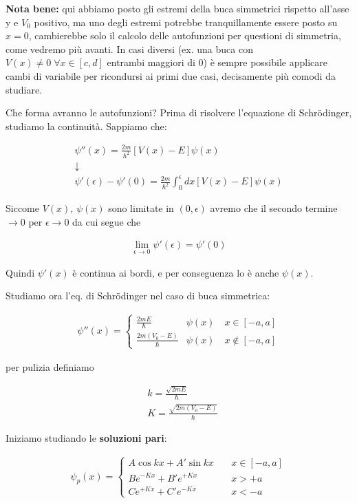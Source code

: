  \textbf{Nota bene:} qui abbiamo posto gli estremi della buca simmetrici rispetto all'asse y e $V_0$ positivo, ma uno degli estremi potrebbe tranquillamente essere posto su $x=0$, cambierebbe solo il calcolo delle autofunzioni per questioni di simmetria, come vedremo più avanti. In casi diversi (ex. una buca con $V(x)\neq 0 \; \forall x \in[c,d]$ entrambi maggiori di 0) è sempre possibile applicare cambi di variabile per ricondursi ai primi due casi, decisamente più comodi da studiare.
  
 Che forma avranno le autofunzioni? Prima di risolvere l'equazione di Schrödinger, studiamo la continuità. Sappiamo che:
 
 \begin{align}
 \psi''(x)= \frac{2m}{\hbar^2}[V(x)-E]\psi(x) \\
 \downarrow \nonumber \\
 \psi'(\epsilon) - \psi'(0)= \frac{2m}{\hbar^2} \int_{0}^{\epsilon}dx [V(x)-E]\psi(x)
  \end{align}
 
 
 Siccome $V(x), \, \psi(x)$ sono limitate in $(0,\epsilon)$ avremo che il secondo termine $\rightarrow 0$ per $\epsilon \rightarrow 0$ da cui segue che
 
 \begin{align}
 \lim_{\epsilon \rightarrow 0}\psi'(\epsilon)= \psi'(0)
 \end{align}
 
 Quindi $\psi'(x)$ è continua ai bordi, e per conseguenza lo è anche $\psi(x)$.
 
 Studiamo ora l'eq. di Schrödinger nel caso di buca simmetrica:
 
 \begin{align}
 \psi''(x)=
 \left\{
\begin{array}{cc}
\frac{2mE}{\hbar}{}&\psi(x)\quad x\in [-a,a] \\
\frac{2m(V_0 - E)}{\hbar}&\psi(x) \quad x\notin [-a,a]
\end{array} 
 \right.
 \end{align}
 
per pulizia definiamo

\begin{align}
{}&k= \frac{\sqrt{2mE}}{\hbar} \\
&K= \frac{\sqrt{2m(V_0 - E)}}{\hbar}
\end{align}

Iniziamo studiando le \textbf{soluzioni pari}:

\begin{align}
 \psi_p(x)=
 \left\{
 \begin{array}{ccc}
 A\cos{kx}+ A'\sin{kx} \quad {}&x\in [-a,a] \\
 Be^{-Kx}+B'e^{+Kx} \quad &x>+a \\
 Ce^{+Kx}+C'e^{-Kx} \quad &x<-a
 \end{array} 
 \right.
\end{align}
 
